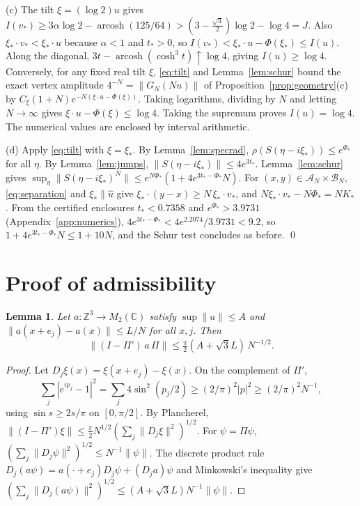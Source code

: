 \documentclass[11pt]{amsart}
\newtheorem{lemma}[theorem]{Lemma}
\theoremstyle{definition}
\theoremstyle{remark}
\newcommand{\Z}{\mathbb{Z}}
\newcommand{\C}{\mathbb{C}}
\newcommand{\cA}{\mathcal{A}}
\newcommand{\cB}{\mathcal{B}}
\newcommand{\arcosh}{\operatorname{arcosh}}
\newcommand{\uhat}{\hat u}
\begin{document}
(c) The tilt $\xi=(\log2)u$ gives
$I(v_*)\ge3\alpha\log2-\arcosh(125/64)>(3-\tfrac{\sqrt3}2)\log2-\log4=J$.
Also $\xi_*\cdot v_*<\xi_*\cdot u$ because $\alpha<1$ and $t_*>0$, so
$I(v_*)<\xi_*\cdot u-\Phi(\xi_*)\le I(u)$.  Along the diagonal,
$3t-\arcosh(\cosh^3t)\uparrow\log4$, giving $I(u)\ge\log4$.
Conversely, for any fixed real tilt $\xi$, \eqref{eq:tilt} and
Lemma~\ref{lem:schur} bound the exact vertex amplitude
$4^{-N}=\|G_N(Nu)\|$ of Proposition~\ref{prop:geometry}(c) by
$C_\xi(1+N)e^{-N(\xi\cdot u-\Phi(\xi))}$.
Taking logarithms, dividing by $N$ and letting $N\to\infty$ gives
$\xi\cdot u-\Phi(\xi)\le\log4$. Taking the supremum proves
$I(u)=\log4$. The numerical values are
enclosed by interval arithmetic.

(d) Apply \eqref{eq:tilt} with $\xi=\xi_*$.  By Lemma~\ref{lem:specrad},
$\rho(S(\eta-i\xi_*))\le e^{\Phi_*}$ for all $\eta$.  By
Lemma~\ref{lem:jumps}, $\|S(\eta-i\xi_*)\|\le4e^{3t_*}$.
Lemma~\ref{lem:schur} gives
$\sup_\eta\|S(\eta-i\xi_*)^N\|\le e^{N\Phi_*}(1+4e^{3t_*-\Phi_*}N)$.  For
$(x,y)\in\cA_N\times\cB_N$, \eqref{eq:separation} and $\xi_*\parallel\uhat$
give $\xi_*\cdot(y-x)\ge N\,\xi_*\cdot v_*$, and
$N\xi_*\cdot v_*-N\Phi_*=NK_*$.  From the certified enclosures
$t_*<0.7358$ and $e^{\Phi_*}>3.9731$ (Appendix~\ref{app:numerics}),
$4e^{3t_*-\Phi_*}<4e^{2.2074}/3.9731<9.2$, so
$1+4e^{3t_*-\Phi_*}N\le1+10N$, and the Schur test concludes as before.
\qed

\section{Proof of admissibility}\label{sec:admissible}

\begin{lemma}\label{lem:IR1}
Let $a:\Z^3\to M_2(\C)$ satisfy $\sup\|a\|\le A$ and
$\|a(x+e_j)-a(x)\|\le L/N$ for all $x,j$.  Then
\[
\|(I-\Pi')\,a\,\Pi\|\le\tfrac\pi2(A+\sqrt3L)\,N^{-1/2}.
\]
\end{lemma}

\begin{proof}
Let $D_j\xi(x)=\xi(x+e_j)-\xi(x)$.  On the complement of $\Pi'$,
\[
\sum_j|e^{ip_j}-1|^2=\sum_j4\sin^2(p_j/2)\ge(2/\pi)^2|p|^2\ge(2/\pi)^2N^{-1},
\]
using $\sin s\ge2s/\pi$ on $[0,\pi/2]$.  By Plancherel,
$\|(I-\Pi')\xi\|\le\frac\pi2N^{1/2}(\sum_j\|D_j\xi\|^2)^{1/2}$.  For
$\psi=\Pi\psi$, $(\sum_j\|D_j\psi\|^2)^{1/2}\le N^{-1}\|\psi\|$.  The
discrete product rule
$D_j(a\psi)=a(\cdot+e_j)D_j\psi+(D_ja)\psi$ and Minkowski's inequality give
$(\sum_j\|D_j(a\psi)\|^2)^{1/2}\le(A+\sqrt3L)N^{-1}\|\psi\|$.
\end{proof}
\end{document}
